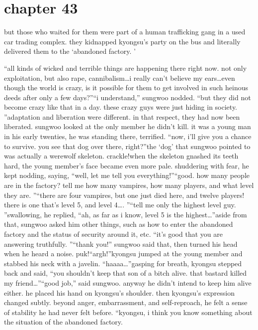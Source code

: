 \section{chapter 43}

                            but those who waited for them were part of a human trafficking gang in a used car trading complex.
 they kidnapped kyongsu’s party on the bus and literally delivered them to the ‘abandoned factory.
’




“all kinds of wicked and terrible things are happening there right now.
 not only exploitation, but also rape, cannibalism…i really can’t believe my ears…even though the world is crazy, is it possible for them to get involved in such heinous deeds after only a few days?”“i understand,” sungwoo nodded.
“but they did not become crazy like that in a day.
 these crazy guys were just hiding in society.
”adaptation and liberation were different.
 in that respect, they had now been liberated.
sungwoo looked at the only member he didn’t kill.
 it was a young man in his early twenties, he was standing there, terrified.
“now, i’ll give you a chance to survive.
 you see that dog over there, right?”the ‘dog’ that sungwoo pointed to was actually a werewolf skeleton.
crackle!when the skeleton gnashed its teeth hard, the young member’s face became even more pale.
 shuddering with fear, he kept nodding, saying, “well, let me tell you everything!”“good.
 how many people are in the factory? tell me how many vampires, how many players, and what level they are.
”“there are four vampires, but one just died here, and twelve players! there is one that’s level 5, and level 4….
”“tell me only the highest level guy.
”swallowing, he replied, “ah, as far as i know, level 5 is the highest…”aside from that, sungwoo asked him other things, such as how to enter the abandoned factory and the status of security around it, etc.
“it’s good that you are answering truthfully.
”“thank you!”
sungwoo said that, then turned his head when he heard a noise.
puk!“argh!”kyongsu jumped at the young member and stabbed his neck with a javelin.
“haaaa…”gasping for breath, kyongsu stepped back and said, “you shouldn’t keep that son of a bitch alive.
 that bastard killed my friend…”“good job,” said sungwoo.
anyway he didn’t intend to keep him alive either.
he placed his hand on kyongsu’s shoulder.
 then kyongsu’s expression changed subtly.
 beyond anger, embarrassment, and self-reproach, he felt a sense of stability he had never felt before.
“kyongsu, i think you know something about the situation of the abandoned factory.
